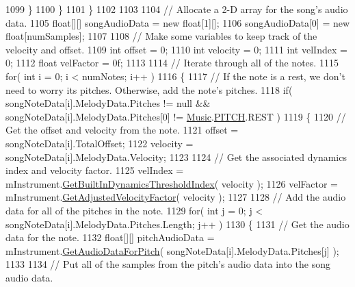 \begin{DoxyCodeInclude}
1099                 \}
1100             \}
1101         \}
1102 
1103 
1104         \textcolor{comment}{// Allocate a 2-D array for the song's audio data.}
1105         \textcolor{keywordtype}{float}[][] songAudioData = \textcolor{keyword}{new} \textcolor{keywordtype}{float}[1][];
1106         songAudioData[0] = \textcolor{keyword}{new} \textcolor{keywordtype}{float}[numSamples];
1107 
1108         \textcolor{comment}{// Make some variables to keep track of the velocity and offset.}
1109         \textcolor{keywordtype}{int} offset = 0;
1110         \textcolor{keywordtype}{int} velocity = 0;
1111         \textcolor{keywordtype}{int} velIndex = 0;
1112         \textcolor{keywordtype}{float} velFactor = 0f;
1113 
1114         \textcolor{comment}{// Iterate through all of the notes.}
1115         \textcolor{keywordflow}{for}( \textcolor{keywordtype}{int} i = 0; i < numNotes; i++ )
1116         \{
1117             \textcolor{comment}{// If the note is a rest, we don't need to worry its pitches. Otherwise, add the note's
       pitches.}
1118             \textcolor{keywordflow}{if}( songNoteData[i].MelodyData.Pitches != null && songNoteData[i].MelodyData.Pitches[0] != 
      \hyperlink{class_music}{Music}.\hyperlink{group___music_enums_ga508f69b199ea518f935486c990edac1d}{PITCH}.REST )
1119             \{
1120                 \textcolor{comment}{// Get the offset and velocity from the note.}
1121                 offset = songNoteData[i].TotalOffset;
1122                 velocity = songNoteData[i].MelodyData.Velocity;
1123 
1124                 \textcolor{comment}{// Get the associated dynamics index and velocity factor.}
1125                 velIndex = mInstrument.\hyperlink{group___v_i_base_pub_func_gacddf07c08c3a8154a6934be22f539788}{GetBuiltInDynamicsThresholdIndex}( 
      velocity );
1126                 velFactor = mInstrument.\hyperlink{group___v_i_base_pub_func_gae638c68bd0e79d0b99495be69e50f49d}{GetAdjustedVelocityFactor}( velocity );
1127 
1128                 \textcolor{comment}{// Add the audio data for all of the pitches in the note.}
1129                 \textcolor{keywordflow}{for}( \textcolor{keywordtype}{int} j = 0; j < songNoteData[i].MelodyData.Pitches.Length; j++ )
1130                 \{
1131                     \textcolor{comment}{// Get the audio data for the note.}
1132                     \textcolor{keywordtype}{float}[][] pitchAudioData = mInstrument.\hyperlink{group___v_i_base_pub_func_gaf715f7c3bbd2f1a2fa543b2f0684f8a6}{GetAudioDataForPitch}( 
      songNoteData[i].MelodyData.Pitches[j] );
1133 
1134                     \textcolor{comment}{// Put all of the samples from the pitch's audio data into the song audio data.}

\end{DoxyCodeInclude}
